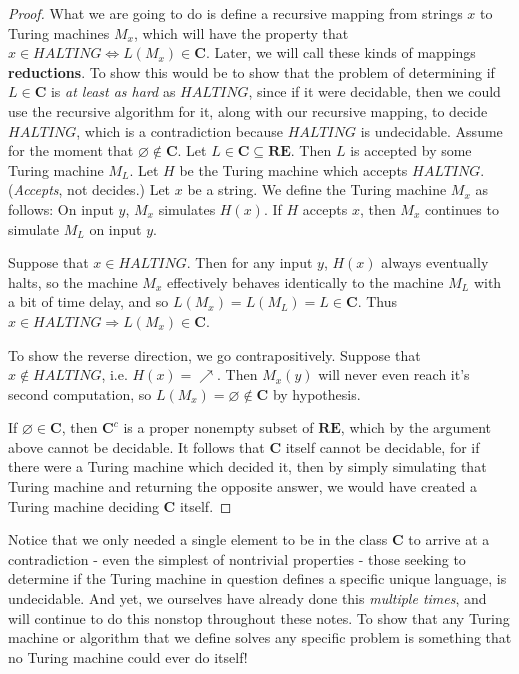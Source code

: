 \documentclass{article}
\theoremstyle{definition}
\theoremstyle{plain}
\theoremstyle{theorem}
\begin{document}
\begin{proof}
    What we are going to do is define a recursive mapping from strings $x$ to Turing machines $M_x$, which will have the property that $x \in HALTING \iff L(M_x) \in \textbf{C}$. Later, we will call these kinds of mappings \textbf{reductions}. To show this would be to show that the problem of determining if $L \in \textbf{C}$ is \textit{at least as hard} as $HALTING$, since if it were decidable, then we could use the recursive algorithm for it, along with our recursive mapping, to decide $HALTING$, which is a contradiction because $HALTING$ is undecidable.
    Assume for the moment that $\varnothing \notin \textbf{C}$. Let $L \in \textbf{C} \subseteq \textbf{RE}$. Then $L$ is accepted by some Turing machine $M_L$. Let $H$ be the Turing machine which accepts $HALTING$. (\textit{Accepts}, not decides.) Let $x$ be a string. We define the Turing machine $M_x$ as follows: On input $y$, $M_x$ simulates $H(x)$. If $H$ accepts $x$, then $M_x$ continues to simulate $M_L$ on input $y$. 
    \par Suppose that $x \in HALTING$. Then for any input $y$, $H(x)$ always eventually halts, so the machine $M_x$ effectively behaves identically to the machine $M_L$ with a bit of time delay, and so $L(M_x) = L(M_L) = L \in \textbf{C}$. Thus $x \in HALTING \Rightarrow L(M_x) \in \textbf{C}$.
    \par To show the reverse direction, we go contrapositively. Suppose that $x \notin HALTING$, i.e.  $H(x) = \nearrow$. Then $M_x(y)$ will never even reach it's second computation, so $L(M_x) = \varnothing \notin \textbf{C}$ by hypothesis. 
    \par If $\varnothing \in \textbf{C}$, then $\textbf{C}^c$ is a proper nonempty subset of $\textbf{RE}$, which by the argument above cannot be decidable. It follows that \textbf{C} itself cannot be decidable, for if there were a Turing machine which decided it, then by simply simulating that Turing machine and returning the opposite answer, we would have created a Turing machine deciding \textbf{C} itself.
\end{proof}
Notice that we only needed a single element to be in the class \textbf{C} to arrive at a contradiction - even the simplest of nontrivial properties - those seeking to determine if the Turing machine in question defines a specific unique language, is undecidable. And yet, we ourselves have already done this \textit{multiple times}, and will continue to do this nonstop throughout these notes. To show that any Turing machine or algorithm that we define solves any specific problem is something that no Turing machine could ever do itself!
\end{document}

